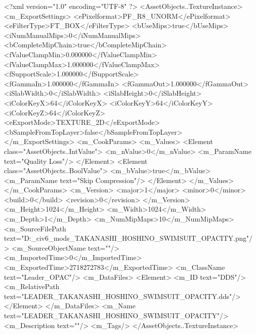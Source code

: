 <?xml version="1.0" encoding="UTF-8" ?>
<AssetObjects..TextureInstance>
	<m_ExportSettings>
		<ePixelformat>PF_R8_UNORM</ePixelformat>
		<eFilterType>FT_BOX</eFilterType>
		<bUseMips>true</bUseMips>
		<iNumManualMips>0</iNumManualMips>
		<bCompleteMipChain>true</bCompleteMipChain>
		<fValueClampMin>0.000000</fValueClampMin>
		<fValueClampMax>1.000000</fValueClampMax>
		<fSupportScale>1.000000</fSupportScale>
		<fGammaIn>1.000000</fGammaIn>
		<fGammaOut>1.000000</fGammaOut>
		<iSlabWidth>0</iSlabWidth>
		<iSlabHeight>0</iSlabHeight>
		<iColorKeyX>64</iColorKeyX>
		<iColorKeyY>64</iColorKeyY>
		<iColorKeyZ>64</iColorKeyZ>
		<eExportMode>TEXTURE_2D</eExportMode>
		<bSampleFromTopLayer>false</bSampleFromTopLayer>
	</m_ExportSettings>
	<m_CookParams>
		<m_Values>
			<Element class="AssetObjects..IntValue">
				<m_nValue>0</m_nValue>
				<m_ParamName text="Quality Loss"/>
			</Element>
			<Element class="AssetObjects..BoolValue">
				<m_bValue>true</m_bValue>
				<m_ParamName text="Skip Compression"/>
			</Element>
		</m_Values>
	</m_CookParams>
	<m_Version>
		<major>1</major>
		<minor>0</minor>
		<build>0</build>
		<revision>0</revision>
	</m_Version>
	<m_Height>1024</m_Height>
	<m_Width>1024</m_Width>
	<m_Depth>1</m_Depth>
	<m_NumMipMaps>10</m_NumMipMaps>
	<m_SourceFilePath text="D:\Documents\GitHub\Uzuki_civ6_mods\BankHeisters\LEADER_TAKANASHI_HOSHINO_SWIMSUIT_OPACITY.png"/>
	<m_SourceObjectName text=""/>
	<m_ImportedTime>0</m_ImportedTime>
	<m_ExportedTime>2718272783</m_ExportedTime>
	<m_ClassName text="Leader_OPAC"/>
	<m_DataFiles>
		<Element>
			<m_ID text="DDS"/>
			<m_RelativePath text="LEADER_TAKANASHI_HOSHINO_SWIMSUIT_OPACITY.dds"/>
		</Element>
	</m_DataFiles>
	<m_Name text="LEADER_TAKANASHI_HOSHINO_SWIMSUIT_OPACITY"/>
	<m_Description text=""/>
	<m_Tags/>
</AssetObjects..TextureInstance>

